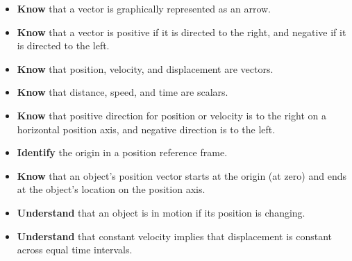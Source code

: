 \documentclass[dvipsnames]{article}
\begin{document}
\begin{itemize}[itemsep=0pt,topsep=-3pt]
    \item \textbf{Know} that a vector is graphically represented as an arrow.
    \item \textbf{Know} that a vector is positive if it is directed to the right, and negative if it is directed to the left.
    \item \textbf{Know} that position, velocity, and displacement are vectors.
    \item \textbf{Know} that distance, speed, and time are scalars.
    \item \textbf{Know} that positive direction for position or velocity is to the right on a horizontal position axis, and negative direction is to the left.
    \begin{center}
    \end{center}

    \item \textbf{Identify} the origin in a position reference frame.
    \item \textbf{Know} that an object's position vector starts at the origin (at zero) and ends at the object's location on the position axis.
    \item \textbf{Understand} that an object is in motion if its position is changing.

    \begin{center}
    \end{center}
    \item \textbf{Understand} that constant velocity implies that displacement is constant across equal time intervals.


\end{itemize}
\end{document}
